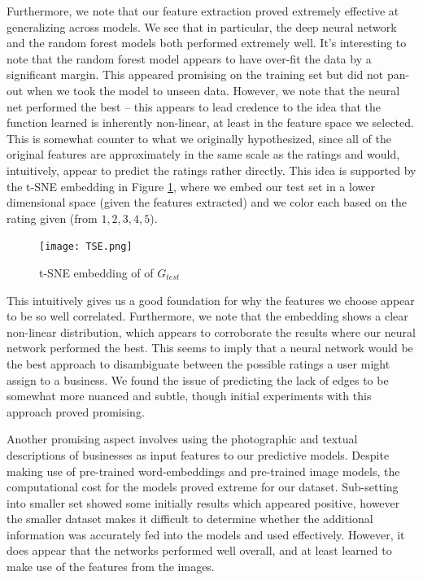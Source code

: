 \documentclass[letterpaper, 10 pt, conference]{ieeeconf}  %
\begin{document}
Furthermore, we note that our feature extraction proved extremely effective at generalizing across models. We see that in particular, the deep neural network and the random forest models both performed extremely well. It's interesting to note that the random forest model appears to have over-fit the data by a significant margin. This appeared promising on the training set but did not pan-out when we took the model to unseen data. However, we note that the neural net performed the best -- this appears to lead credence to the idea that the function learned is inherently non-linear, at least in the feature space we selected. This is somewhat counter to what we originally hypothesized, since all of the original features are approximately in the same scale as the ratings and would, intuitively, appear to predict the ratings rather directly. This idea is supported by the t-SNE embedding in Figure \ref{fig:tsne_embedding}, where we embed our test set in a lower dimensional space (given the features extracted) and we color each based on the rating given (from $1,2,3,4,5$). 

\begin{figure}[h!]
\centering
\texttt{[image: TSE.png]}
\caption{t-SNE embedding of of $G_{test}$}
\label{fig:tsne_embedding}
\end{figure}


This intuitively gives us a good foundation for why the features we choose appear to be so well correlated. Furthermore, we note that the embedding shows a clear non-linear distribution, which appears to corroborate the results where our neural network performed the best. This seems to imply that a neural network would be the best approach to disambiguate between the possible ratings a user might assign to a business. We found the issue of predicting the lack of edges to be somewhat more nuanced and subtle, though initial experiments with this approach proved promising.

Another promising aspect involves using the photographic and textual descriptions of businesses as input features to our predictive models. Despite making use of pre-trained word-embeddings and pre-trained image models, the computational cost for the models proved extreme for our dataset. Sub-setting into smaller set showed some initially results which appeared positive, however the smaller dataset makes it difficult to determine whether the additional information was accurately fed into the models and used effectively. However, it does appear that the networks performed well overall, and at least learned to make use of the features from the images.
\end{document}
